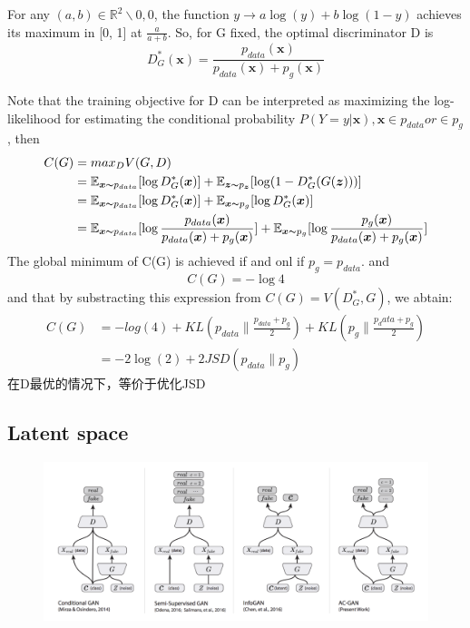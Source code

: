 For any $(a, b) \in \mathbb{R}^2 \backslash {0, 0}$, the function $ y \to a\log(y) + b\log(1 - y)$
achieves its maximum in [0, 1] at $\frac{a}{a + b}$.
So, for G fixed, the optimal discriminator D is
\begin{equation}
    D_{G}^{*}(\boldsymbol{x}) = \frac{p_{data}(\boldsymbol{x})}{p_{data}(\boldsymbol{x}) + p_g(\boldsymbol{x})}
\end{equation}

Note that the training objective for D can be interpreted as maximizing the log-likelihood for
estimating the conditional probability $P(Y = y|\boldsymbol{x}), \boldsymbol{x} \in p_{data} or \in p_g$, then
\begin{equation}
    \begin{split}
        C(G) &= max_D V(G, D) \\
        &= \mathbb{E}_{\boldsymbol{x} \thicksim p_{data}}[\log D_G^*(\boldsymbol{x})] + \mathbb{E}_{\boldsymbol{z} \thicksim p_{\boldsymbol{z}}}[\log(1 - D_G^*(G(\boldsymbol{z})))] \\
        &= \mathbb{E}_{\boldsymbol{x} \thicksim p_{data}}[\log D_G^*(\boldsymbol{x})] + \mathbb{E}_{\boldsymbol{x} \thicksim p_{g}}[\log D_G^*(\boldsymbol{x})] \\
        &= \mathbb{E}_{\boldsymbol{x} \thicksim p_{data}}[\log \frac{p_{data}(\boldsymbol{x})}{p_{data}(\boldsymbol{x}) + p_g(\boldsymbol{x})}] + \mathbb{E}_{\boldsymbol{x} \thicksim p_g}[\log \frac{p_g(\boldsymbol{x})}{p_{data}(\boldsymbol{x}) + p_g(\boldsymbol{x})}]
    \end{split}
\end{equation}
The global minimum of C(G) is achieved if and onl if $p_g = p_{data}$. and
\begin{equation}
    C(G) = - \log 4
\end{equation}
and that by substracting this expression from $C(G) = V(D_G^*, G)$, we abtain:
\begin{equation}
    \begin{split}
        C(G) &= -log(4) + KL(p_{data}\| \frac{p_{data} + p_g}{2}) + KL(p_g \| \frac{p_data + p_g}{2}) \\
        &= -2\log(2) + 2JSD(p_{data}\|p_g)
    \end{split}
\end{equation}
在D最优的情况下，等价于优化JSD

\subsection{Latent space}
\begin{figure}[H]
    \centering
    \includegraphics[width=16cm]{images/cgan_acgan.png}
    \label{fig:CGAN2ACGAN}
\end{figure}
